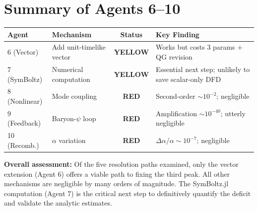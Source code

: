 \documentclass[11pt,a4paper]{article}
\newcommand{\YELLOW}{\textcolor{dfdyellow}{\textbf{YELLOW}}}
\newcommand{\RED}{\textcolor{dfdred}{\textbf{RED}}}
\begin{document}
\newpage
\section{Summary of Agents 6--10}
\label{sec:summary}

\begin{center}
\begin{tabular}{llcl}
\toprule
\textbf{Agent} & \textbf{Mechanism} & \textbf{Status} & \textbf{Key Finding} \\
\midrule
6 (Vector) & Add unit-timelike vector & \YELLOW & Works but costs 3 params + QG revision \\
7 (SymBoltz) & Numerical computation & \YELLOW & Essential next step; unlikely to save scalar-only DFD \\
8 (Nonlinear) & Mode coupling & \RED & Second-order $\sim 10^{-2}$; negligible \\
9 (Feedback) & Baryon-$\psi$ loop & \RED & Amplification $\sim 10^{-40}$; utterly negligible \\
10 (Recomb.) & $\alpha$ variation & \RED & $\Delta\alpha/\alpha \sim 10^{-7}$; negligible \\
\bottomrule
\end{tabular}
\end{center}

\textbf{Overall assessment:} Of the five resolution paths examined, only the vector extension (Agent 6) offers a viable path to fixing the third peak. All other mechanisms are negligible by many orders of magnitude. The SymBoltz.jl computation (Agent 7) is the critical next step to definitively quantify the deficit and validate the analytic estimates.
\end{document}
